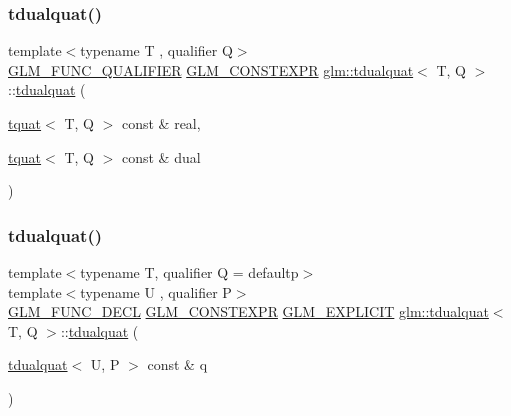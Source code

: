 \subsubsection{\texorpdfstring{tdualquat()}{tdualquat()}\hspace{0.1cm}{\footnotesize\ttfamily [6/11]}}
{\footnotesize\ttfamily template$<$typename T , qualifier Q$>$ \\
\hyperlink{setup_8hpp_a33fdea6f91c5f834105f7415e2a64407}{G\+L\+M\+\_\+\+F\+U\+N\+C\+\_\+\+Q\+U\+A\+L\+I\+F\+I\+ER} \hyperlink{setup_8hpp_a08b807947b47031d3a511f03f89645ad}{G\+L\+M\+\_\+\+C\+O\+N\+S\+T\+E\+X\+PR} \hyperlink{structglm_1_1tdualquat}{glm\+::tdualquat}$<$ T, Q $>$\+::\hyperlink{structglm_1_1tdualquat}{tdualquat} (\begin{DoxyParamCaption}\item[{\hyperlink{structglm_1_1tquat}{tquat}$<$ T, Q $>$ const \&}]{real,  }\item[{\hyperlink{structglm_1_1tquat}{tquat}$<$ T, Q $>$ const \&}]{dual }\end{DoxyParamCaption})}

\mbox{\label{structglm_1_1tdualquat_a1fbee84d447e37ac7542412dab82cbcf}} 
\subsubsection{\texorpdfstring{tdualquat()}{tdualquat()}\hspace{0.1cm}{\footnotesize\ttfamily [7/11]}}
{\footnotesize\ttfamily template$<$typename T, qualifier Q = defaultp$>$ \\
template$<$typename U , qualifier P$>$ \\
\hyperlink{setup_8hpp_ab2d052de21a70539923e9bcbf6e83a51}{G\+L\+M\+\_\+\+F\+U\+N\+C\+\_\+\+D\+E\+CL} \hyperlink{setup_8hpp_a08b807947b47031d3a511f03f89645ad}{G\+L\+M\+\_\+\+C\+O\+N\+S\+T\+E\+X\+PR} \hyperlink{setup_8hpp_a6c74f5a5e7b134ab69023ff9a30d4d5d}{G\+L\+M\+\_\+\+E\+X\+P\+L\+I\+C\+IT} \hyperlink{structglm_1_1tdualquat}{glm\+::tdualquat}$<$ T, Q $>$\+::\hyperlink{structglm_1_1tdualquat}{tdualquat} (\begin{DoxyParamCaption}\item[{\hyperlink{structglm_1_1tdualquat}{tdualquat}$<$ U, P $>$ const \&}]{q }\end{DoxyParamCaption})}

